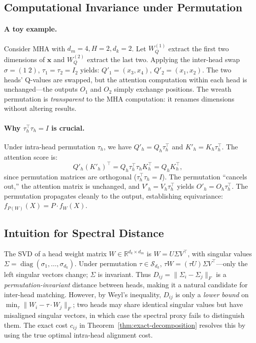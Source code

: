 \subsection{Computational Invariance under Permutation}

\paragraph{A toy example.} Consider MHA with $d_m = 4, H = 2, d_k = 2$. Let $W_Q^{(1)}$ extract the first two dimensions of $\mathbf{x}$ and $W_Q^{(2)}$ extract the last two. Applying the inter-head swap $\sigma = (1\;2)$, $\tau_1 = \tau_2 = I_2$ yields: $Q'_1 = (x_3, x_4)$, $Q'_2 = (x_1, x_2)$. The two heads' Q-values are swapped, but the attention computation within each head is unchanged---the outputs $O_1$ and $O_2$ simply exchange positions. The wreath permutation is \emph{transparent} to the MHA computation: it renames dimensions without altering results.

\paragraph{Why $\tau_h^\top\tau_h = I$ is crucial.} Under intra-head permutation $\tau_h$, we have $Q'_h = Q_h \tau_h^\top$ and $K'_h = K_h \tau_h^\top$. The attention score is:
\begin{equation*}
    Q'_h (K'_h)^\top = Q_h \tau_h^\top \tau_h K_h^\top = Q_h K_h^\top,
\end{equation*}
since permutation matrices are orthogonal ($\tau_h^\top\tau_h = I$). The permutation ``cancels out,'' the attention matrix is unchanged, and $V'_h = V_h \tau_h^\top$ yields $O'_h = O_h \tau_h^\top$. The permutation propagates cleanly to the output, establishing equivariance: $f_{P(W)}(X) = P \cdot f_W(X)$.

\subsection{Intuition for Spectral Distance}

The SVD of a head weight matrix $W \in \mathbb{R}^{d_k \times d_m}$ is $W = U \Sigma V^\top$, with singular values $\Sigma = \operatorname{diag}(\sigma_1, \ldots, \sigma_{d_k})$. Under permutation $\tau \in \mathcal{S}_{d_k}$, $\tau W = (\tau U) \Sigma V^\top$---only the left singular vectors change; $\Sigma$ is invariant. Thus $D_{ij} = \|\Sigma_i - \Sigma_j\|_F$ is a \emph{permutation-invariant} distance between heads, making it a natural candidate for inter-head matching. However, by Weyl's inequality, $D_{ij}$ is only a \emph{lower bound} on $\min_\tau \|W_i - \tau \cdot W_j\|_F$; two heads may share identical singular values but have misaligned singular vectors, in which case the spectral proxy fails to distinguish them. The exact cost $c_{ij}$ in Theorem~\ref{thm:exact-decomposition} resolves this by using the true optimal intra-head alignment cost.


